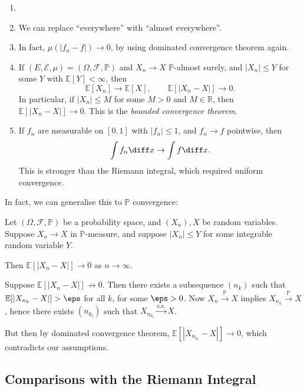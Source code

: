 \documentclass[12pt]{article}
\begin{document}
\begin{remark}
	\begin{enumerate}
		\item[]
		\item We can replace ``everywhere'' with ``almost everywhere''.
		\item In fact, $\mu(|f_n - f|) \to 0$, by using dominated convergence theorem again.
		\item If $(E, \mathcal{E}, \mu) = (\Omega, \mathcal{F}, \mathbb{P})$ and $X_n \to X$ $\mathbb{P}$-almost surely, and $|X_n| \leq Y$ for some $Y$ with $\mathbb{E}[Y] < \infty$, then
			\[
			\mathbb{E}[X_n] \to \mathbb{E}[X], \qquad \mathbb{E}[|X_n-X|] \to 0.
			\]
			In particular, if $|X_n| \leq M$ for some $M > 0$ and $M \in \mathbb{R}$, then $\mathbb{E}[|X_n-X|] \to 0$. This is the \emph{bounded convergence theorem}.
		\item If $f_n$ are measurable on $[0,1]$ with $|f_n| \leq 1$, and $f_n \to f$ pointwise, then
			\[
			\int f_n \diff x \to \int f \diff x.
			\]
			This is stronger than the Riemann integral, which required uniform convergence.
	\end{enumerate}
\end{remark}


In fact, we can generalise this to $\mathbb{P}$ convergence:

\begin{theorem}
	Let $(\Omega, \mathcal{F}, \mathbb{P})$ be a probability space, and $(X_n), X$ be random variables. Suppose $X_n \to X$ in $\mathbb{P}$-measure, and suppose $|X_n| \leq Y$ for some integrable random variable $Y$.

	Then $\mathbb{E}[|X_n-X|] \to 0$ as $n \to \infty$.
\end{theorem}

\begin{proofbox}
	Suppose $\mathbb{E}[|X_n-X|]\not \to 0$. Then there exists a subsequence $(n_k)$ such that $\mathbb{E}[|X_{n_k}-X|] > \eps$ for all $k$, for some $\eps > 0$. Now $X_n \overset{\mathbb{P}}{\to} X$ implies $X_{n_k} \overset{\mathbb{P}}{\to} X$, hence there exists $(n_{k_l})$ such that $X_{n_{k_l}} \overset{\text{a.s.}}{\to} X$.

	But then by dominated convergence theorem, $\mathbb{E}[|X_{n_{k_l}} - X|] \to 0$, which contradicts our assumptions.
\end{proofbox}


\subsection{Comparisons with the Riemann Integral}
\label{sub:comp_riemann}
\end{document}
